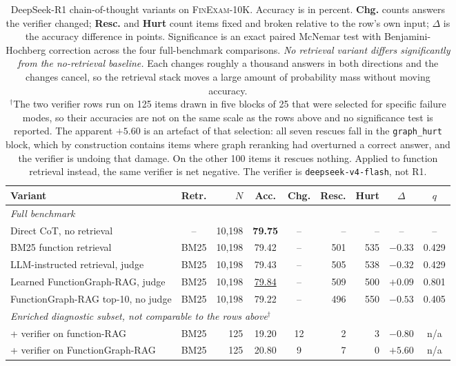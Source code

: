 \begin{table}[t]\centering\small
\begin{tabular}{lcrccrrcc}
\toprule
\textbf{Variant} & \textbf{Retr.} & \textbf{$N$} & \textbf{Acc.} & \textbf{Chg.} & \textbf{Resc.} & \textbf{Hurt} & \textbf{$\Delta$} & \textbf{$q$} \\
\midrule
\multicolumn{9}{l}{\textit{Full benchmark}} \\
Direct CoT, no retrieval        & --   & 10{,}198 & \textbf{79.75} & --    & --  & --  & --      & --    \\
BM25 function retrieval         & BM25 & 10{,}198 & 79.42 & --    & 501 & 535 & $-0.33$ & 0.429 \\
LLM-instructed retrieval, judge & BM25 & 10{,}198 & 79.43 & --    & 505 & 538 & $-0.32$ & 0.429 \\
Learned FunctionGraph-RAG, judge     & BM25 & 10{,}198 & \underline{79.84} & -- & 509 & 500 & $+0.09$ & 0.801 \\
FunctionGraph-RAG top-10, no judge          & BM25 & 10{,}198 & 79.22 & --    & 496 & 550 & $-0.53$ & 0.405 \\
\midrule
\multicolumn{9}{l}{\textit{Enriched diagnostic subset, not comparable to the rows above}$^{\dagger}$} \\
\quad + verifier on function-RAG & BM25 & 125 & 19.20 & 12 & 2 & 3 & $-0.80$ & n/a \\
\quad + verifier on FunctionGraph-RAG    & BM25 & 125 & 20.80 & 9  & 7 & 0 & $+5.60$ & n/a \\
\bottomrule
\end{tabular}
\caption{DeepSeek-R1 chain-of-thought variants on \textsc{FinExam-10K}. Accuracy is in percent.
\textbf{Chg.} counts answers the verifier changed; \textbf{Resc.} and \textbf{Hurt} count items
fixed and broken relative to the row's own input; $\Delta$ is the accuracy difference in points.
Significance is an exact paired McNemar test with Benjamini-Hochberg correction across the four
full-benchmark comparisons. \emph{No retrieval variant differs significantly from the
no-retrieval baseline.} Each changes roughly a thousand answers in both directions and the
changes cancel, so the retrieval stack moves a large amount of probability mass without moving
accuracy.\\
$^{\dagger}$The two verifier rows run on 125 items drawn in five blocks of 25 that were selected
for specific failure modes, so their accuracies are not on the same scale as the rows above and
no significance test is reported. The apparent $+5.60$ is an artefact of that selection: all
seven rescues fall in the \texttt{graph\_hurt} block, which by construction contains items where
graph reranking had overturned a correct answer, and the verifier is undoing that damage. On the
other 100 items it rescues nothing. Applied to function retrieval instead, the same verifier is
net negative. The verifier is \texttt{deepseek-v4-flash}, not R1.}
\label{tab:r1-variants}
\end{table}

